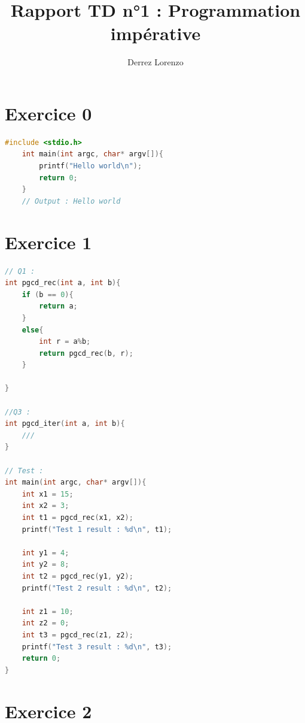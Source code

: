 \documentclass{article}
\title{Rapport TD n°1 : Programmation impérative}
\author{Derrez Lorenzo}
\begin{document}
\maketitle

\section*{\textbf{Exercice 0}}

\begin{lstlisting}[language=C, caption ={Print Hello World}]
    #include <stdio.h>
    int main(int argc, char* argv[]){
        printf("Hello world\n"); 
        return 0; 
    }
    // Output : Hello world
\end{lstlisting}

\section*{\textbf{Exercice 1}}

\begin{lstlisting}[language=C, caption={PGCD}]
    // Q1 : 
int pgcd_rec(int a, int b){
    if (b == 0){
        return a; 
    }
    else{
        int r = a%b; 
        return pgcd_rec(b, r); 
    }
     
}

//Q3 :
int pgcd_iter(int a, int b){
    ///
}

// Test : 
int main(int argc, char* argv[]){
    int x1 = 15; 
    int x2 = 3; 
    int t1 = pgcd_rec(x1, x2); 
    printf("Test 1 result : %d\n", t1); 
    
    int y1 = 4; 
    int y2 = 8; 
    int t2 = pgcd_rec(y1, y2); 
    printf("Test 2 result : %d\n", t2);

    int z1 = 10; 
    int z2 = 0; 
    int t3 = pgcd_rec(z1, z2); 
    printf("Test 3 result : %d\n", t3); 
    return 0; 
}
\end{lstlisting}

\section*{\textbf{Exercice 2}}
\end{document}

